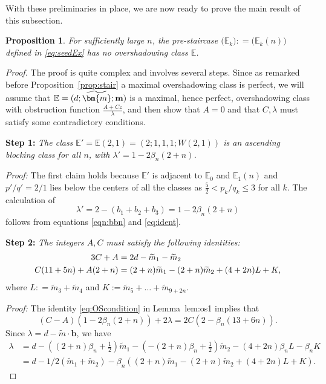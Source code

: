 \documentclass[11pt, reqno]{amsart}
\newtheorem{prop}[thm]{Proposition}
\theoremstyle{remark}
\numberwithin{equation}{subsection}
\numberwithin{figure}{section}
\theoremstyle{customremark}
\newcommand{\Tm}{{\widetilde m}}
\newcommand{\NI}{{\noindent}}
\newcommand{\bE}{{\mathbb E}}
\newcommand{\be}{{\beta}}
\newcommand{\la}{{\lambda}}
\newcommand{\MS}{{\medskip}}
\newcommand{\btm}{\widetilde{\bm{m}}}
\begin{document}
%
With these preliminaries in place, we are now ready to prove the main result of this subsection.

\begin{prop}\label{prop:OS} For sufficiently large $n$, the pre-staircase  $\bigl(\bE_k\bigr) : = \bigl(\bE_k(n)\bigr)$  defined in \eqref{eq:seedEx} has no overshadowing class $\bE$.
\end{prop}
\begin{proof}
The proof is quite complex and involves several steps. Since as remarked before Proposition~\ref{prop:stair} a maximal overshadowing class is perfect, we will assume that $\bE = (d; \btm; \bf m)$ is a maximal, hence perfect, overshadowing class
with obstruction function $\frac{A + Cz}{\la}$, and then show that $A=0$ and that $C,\la$ must satisfy some contradictory conditions.
\MS

\NI {\bf Step 1:} {\it The class $\bE'=\bE(2,1)=(2;1,1,1;W(2,1))$  is an  ascending blocking class for all $n$, with
$\la' = 1-2\be_n(2+n)$.}
\MS

\NI
{\it Proof:}
The first claim holds because $\bE'$ 
 is adjacent to $\bE_0$ and $\bE_1(n)$  and $p'/q'= 2/1$ lies below the centers of all the classes as $\frac{5}{2}<p_k/q_k \leq 3$ for all $k$.
 The calculation of \[\la' = 2- (b_1+b_2+b_3)=1-2\be_n(2+n)\] follows from equations \eqref{eqn:bbn} and  \eqref{eq:ident}.
 \MS\MS
 
\NI {\bf Step 2:} {\it  The integers $A,C$ must satisfy the following identities:}
\begin{align} \label{eq:arith}
    3C+A&=2d-\widetilde{m}_1-\widetilde{m}_2 \\ \notag
    C(11+5n)+A(2+n)&=(2+n)\widetilde{m}_1-(2+n)\widetilde{m}_2+(4+2n)L+K,
\end{align}
where $L: = \widetilde{m}_3 + \widetilde{m}_4$ and $K:=\widetilde{m}_5+\hdots +\widetilde{m}_{9+2n}$.
\MS

 \NI
 {\it Proof:} The identity
 \eqref{eq:OScondition} in Lemma~{lem:os1} implies that 
 \begin{equation} \label{eq:firstArith}
    (C-A)(1-2\be_n(2+n))+2\la=2C(2-\be_n(13+6n)). 
\end{equation} 
Since $\la = d - \Tm\cdot\bm{b}$, we have
\begin{align*} \la&=d-((2+n)\be_n+\tfrac12)\widetilde{m}_1-(-(2+n)\be_n+\tfrac12)\widetilde{m}_2-(4+2n)\be_nL-\be_nK \\
&=d-1/2(\widetilde{m}_1+\widetilde{m}_2)-\be_n\left((2+n)\widetilde{m}_1-(2+n)\widetilde{m}_2+(4+2n)L+K\right).
\end{align*}


\end{proof}
\end{document}
